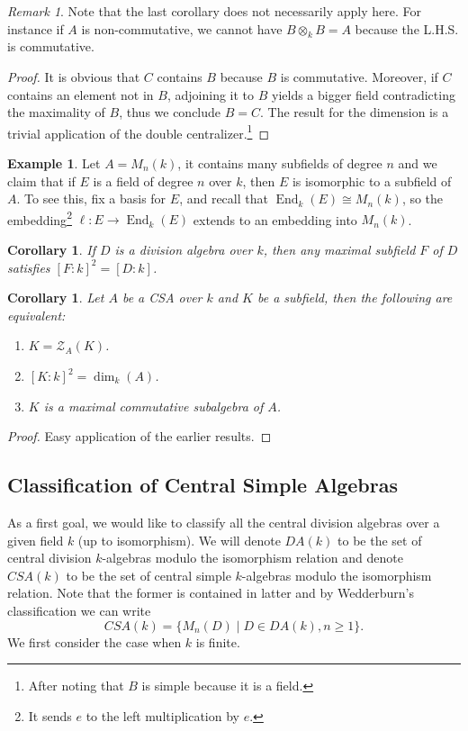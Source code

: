 \documentclass{tufte-handout} %
\newtheorem{cor}[thm]{Corollary}
\theoremstyle{definition}
\newtheorem{exmp}[thm]{Example}
\theoremstyle{remark}
\newtheorem{rem}[thm]{Remark}
\newcommand{\mZ}{\mathcal{Z}}
\DeclareMathOperator{\End}{End}
\begin{document}
\begin{rem}
	Note that the last corollary does not necessarily apply here. For instance if $A$ is non-commutative, we cannot have $B\otimes_k B = A$ because the L.H.S. is commutative.
\end{rem}
\begin{proof}
	It is obvious that $C$ contains $B$ because $B$ is commutative. Moreover, if $C$ contains an element not in $B$, adjoining it to $B$ yields a bigger field contradicting the maximality of $B$, thus we conclude $B = C$. The result for the dimension is a trivial application of the double centralizer.\footnote{After noting that $B$ is simple because it is a field.}
\end{proof}
\begin{exmp}
	Let $A = M_n(k)$, it contains many subfields of degree $n$ and we claim that if $E$ is a field of degree $n$ over $k$, then $E$ is isomorphic to a subfield of $A$. To see this, fix a basis for $E$, and recall that $\End_k(E) \cong M_n(k)$, so the embedding\footnote{It sends $e$ to the left multiplication by $e$.} $\ell: E \rightarrow \End_k(E)$ extends to an embedding into $M_n(k)$.
\end{exmp}
\begin{cor}
	If $D$ is a division algebra over $k$, then any maximal subfield $F$ of $D$ satisfies $[F:k]^2 = [D:k]$.
\end{cor}
\begin{cor}\label{cormaxsubfield}
	Let $A$ be a CSA over $k$ and $K$ be a subfield, then the following are equivalent:
	\begin{enumerate}
		\item $K = \mZ_A(K)$.
		\item $[K:k]^2 = \dim_k(A)$.
		\item $K$ is a maximal commutative subalgebra of $A$.
	\end{enumerate}
\end{cor}
\begin{proof}
	Easy application of the earlier results.
\end{proof}

\subsection{Classification of Central Simple Algebras}
As a first goal, we would like to classify all the central division algebras over a given field $k$ (up to isomorphism). We will denote $DA(k)$ to be the set of central division $k$-algebras modulo the isomorphism relation and denote $CSA(k)$ to be the set of central simple $k$-algebras modulo the isomorphism relation. Note that the former is contained in latter and by Wedderburn's classification we can write \[CSA(k) = \{M_n(D) \mid D \in DA(k), n\geq 1\}.\]
We first consider the case when $k$ is finite.
\end{document}
